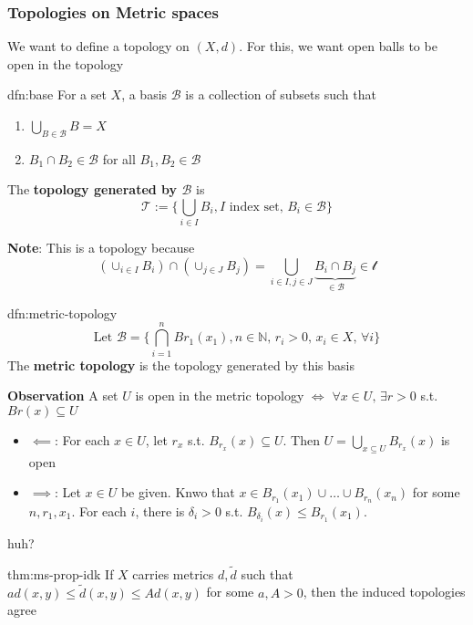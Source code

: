 \documentclass{article}
\begin{document}
\subsubsection{Topologies on Metric spaces}
We want to define a topology on $(X, d)$. For this, we want open balls to be open in the topology

\begin{dfn}[Base]{dfn:base}{}
    For a set $X$, a basis $\mathcal{B}$ is a collection of subsets such that
    \begin{enumerate}
        \item $\bigcup_{B\in\mathcal{B}} B = X$
        \item $B_{1}\cap B_{2}\in \mathcal{B}$ for all $B_{1},B_{2}\in \mathcal{B}$
    \end{enumerate}
    The \textbf{topology generated by $\mathcal{B}$} is
    \[\mathcal{T} := \{\bigcup_{i\in I} B_{i}, \text{$I$ index set},\, B_{i}\in \mathcal{B}\}\]
\end{dfn}

\textbf{Note}: This is a topology because
\[(\cup_{i\in I} B_{i}) \cap (\cup_{j\in J} B_{j}) = \bigcup_{i\in I,j\in J} \underbrace{B_{i} \cap B_{j}}_{\in \mathcal{B}}\in \mathcal{t}\]

\begin{dfn}{dfn:metric-topology}{}
    \[\text{Let } \mathcal{B} = \{\bigcap_{i = 1}^{n} Br_{1}(x_{1}), n\in \mathbb{N},\, r_{i} > 0,\, x_{i}\in X,\,\forall i\}\]
    The \textbf{metric topology} is the topology generated by this basis
\end{dfn}

\textbf{Observation} A set $U$ is open in the metric topology $\iff$ $\forall x\in U,\, \exists r > 0$ s.t. $Br(x) \subseteq U$

\begin{itemize}
    \item $\impliedby$: For each $x\in U$, let $r_{x}$ s.t. $B_{r_{x}}(x) \subseteq U$. Then $U = \bigcup\limits_{x \subseteq U} B_{r_{x}}(x)$ is open
    \item $\implies$: Let $x\in U$ be given. Knwo that $x\in B_{r_{1}}(x_{1}) \cup \dots \cup B_{r_{n}}(x_{n})$ for some $n,r_{1},x_{1}$. For each $i$, there is $\delta_{i} >0$ s.t. $B_{\delta_{i}}(x) \le B_{r_{1}}(x_{1})$.
\end{itemize}

huh?

\begin{thm}{thm:ms-prop-idk}{}
    If $X$ carries metrics $d, \tilde{d}$ such that $ad(x, y) \le \tilde{d}(x,y) \le Ad(x, y)$ for some $a, A > 0$, then the induced topologies agree
\end{thm}
\end{document}
